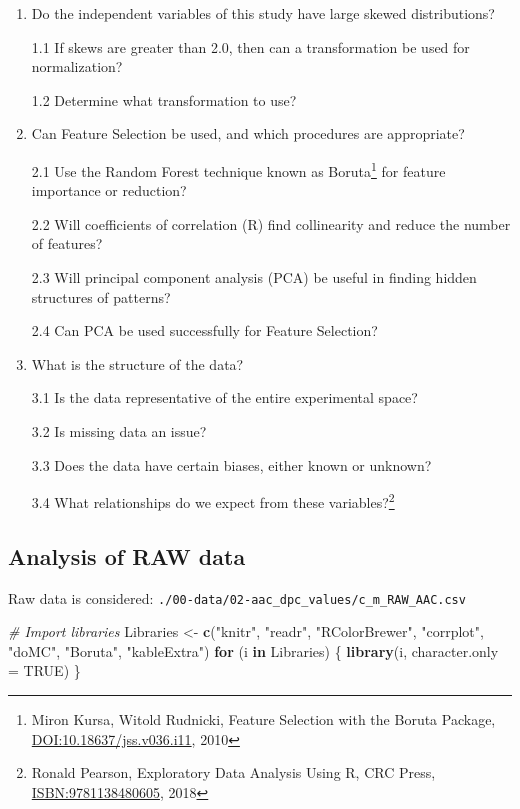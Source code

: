 \documentclass[]{article}
\newenvironment{Shaded}{\begin{snugshade}}{\end{snugshade}}
\newcommand{\CommentTok}[1]{\textcolor[rgb]{0.56,0.35,0.01}{\textit{#1}}}
\newcommand{\ControlFlowTok}[1]{\textcolor[rgb]{0.13,0.29,0.53}{\textbf{#1}}}
\newcommand{\DataTypeTok}[1]{\textcolor[rgb]{0.13,0.29,0.53}{#1}}
\newcommand{\KeywordTok}[1]{\textcolor[rgb]{0.13,0.29,0.53}{\textbf{#1}}}
\newcommand{\NormalTok}[1]{#1}
\newcommand{\OtherTok}[1]{\textcolor[rgb]{0.56,0.35,0.01}{#1}}
\newcommand{\StringTok}[1]{\textcolor[rgb]{0.31,0.60,0.02}{#1}}
\begin{document}
\begin{enumerate}
\def\labelenumi{\arabic{enumi}.}
\item
  Do the independent variables of this study have large skewed
  distributions?

  1.1 If skews are greater than 2.0, then can a transformation be used
  for normalization?

  1.2 Determine what transformation to use?
\item
  Can Feature Selection be used, and which procedures are appropriate?

  2.1 Use the Random Forest technique known as Boruta\footnote{Miron
    Kursa, Witold Rudnicki, Feature Selection with the Boruta Package,
    \url{DOI:10.18637/jss.v036.i11}, 2010} for feature importance or
  reduction?

  2.2 Will coefficients of correlation (R) find collinearity and reduce
  the number of features?

  2.3 Will principal component analysis (PCA) be useful in finding
  hidden structures of patterns?

  2.4 Can PCA be used successfully for Feature Selection?
\item
  What is the structure of the data?

  3.1 Is the data representative of the entire experimental space?

  3.2 Is missing data an issue?

  3.3 Does the data have certain biases, either known or unknown?

  3.4 What relationships do we expect from these variables?\footnote{Ronald
    Pearson, Exploratory Data Analysis Using R, CRC Press,
    \url{ISBN:9781138480605}, 2018}
\end{enumerate}

\hypertarget{analysis-of-raw-data}{%
\subsection{Analysis of RAW data}\label{analysis-of-raw-data}}

Raw data is considered:
\texttt{./00-data/02-aac\_dpc\_values/c\_m\_RAW\_AAC.csv}

\begin{Shaded}
\begin{Highlighting}[]
\CommentTok{# Import libraries}
\NormalTok{Libraries <-}\StringTok{ }\KeywordTok{c}\NormalTok{(}\StringTok{"knitr"}\NormalTok{, }\StringTok{"readr"}\NormalTok{, }\StringTok{"RColorBrewer"}\NormalTok{, }\StringTok{"corrplot"}\NormalTok{, }\StringTok{"doMC"}\NormalTok{, }\StringTok{"Boruta"}\NormalTok{, }\StringTok{"kableExtra"}\NormalTok{)}
\ControlFlowTok{for}\NormalTok{ (i }\ControlFlowTok{in}\NormalTok{ Libraries) \{}
\KeywordTok{library}\NormalTok{(i, }\DataTypeTok{character.only =} \OtherTok{TRUE}\NormalTok{)}
\NormalTok{\}}
\end{Highlighting}
\end{Shaded}
\end{document}
